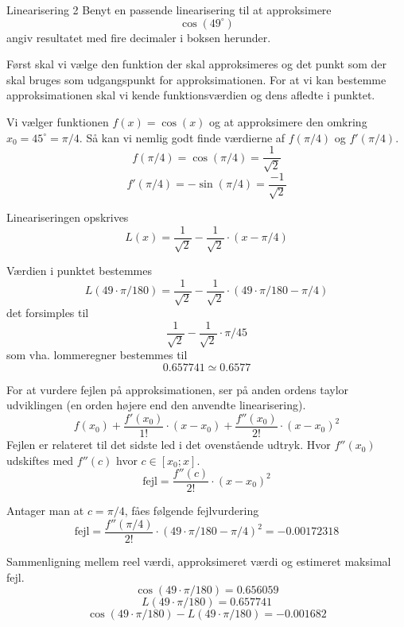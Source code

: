 \documentclass{article}
\begin{document}
\begin{exercise}{Linearisering 2}
Benyt en passende linearisering til at approksimere
\[
\cos(49^\circ)
\]
angiv resultatet med fire decimaler i boksen herunder.

\hint
Først skal vi vælge den funktion der skal approksimeres
og det punkt som der skal bruges som udgangspunkt for 
approksimationen.
For at vi kan bestemme approksimationen skal vi 
kende funktionsværdien og dens afledte i punktet.

\hint
Vi vælger funktionen $f(x) = \cos(x)$ og at approksimere den 
omkring $x_0 = 45^\circ = \pi / 4$.
Så kan vi nemlig godt finde værdierne af $f(\pi / 4)$ og $f'(\pi / 4)$.
\[
f(\pi / 4) = \cos(\pi / 4) = \frac{1}{\sqrt{2}}
\]
\[
f'(\pi / 4) = -\sin(\pi / 4) = \frac{-1}{\sqrt{2}}
\]

\hint
Lineariseringen opskrives
\[
L(x) = \frac{1}{\sqrt{2}} - \frac{1}{\sqrt{2}} \cdot (x - \pi / 4)
\]

\hint
Værdien i punktet bestemmes
\[
L(49 \cdot \pi / 180) = \frac{1}{\sqrt{2}} - \frac{1}{\sqrt{2}} \cdot (49 \cdot \pi / 180 - \pi / 4) 
\]
det forsimples til 
\[
\frac{1}{\sqrt{2}} - \frac{1}{\sqrt{2}} \cdot \pi / 45
\]
som vha. lommeregner bestemmes til 
\[
0.657741 \simeq 0.6577
\]

\hint
For at vurdere fejlen på approksimationen, ser på anden 
ordens taylor udviklingen (en orden højere end den 
anvendte linearisering).
\[
f(x_0) 
	+ \frac{f'(x_0)}{1!} \cdot (x - x_0) 
	+ \frac{f''(x_0)}{2!} \cdot (x - x_0)^2
\]
Fejlen er relateret til det sidste led i det ovenstående udtryk.
Hvor $f''(x_0)$ udskiftes med $f''(c)$ hvor $c \in [x_0; x]$.
\[
\textrm{fejl} = \frac{f''(c)}{2!} \cdot (x - x_0)^2
\]

\hint 
Antager man at $c = \pi/4$, fåes følgende fejlvurdering
\[
\textrm{fejl} = \frac{f''(\pi/4)}{2!} \cdot (49 \cdot \pi / 180 - \pi / 4)^2 = 
-0.00172318\]

\hint
Sammenligning mellem reel værdi, approksimeret værdi og estimeret maksimal fejl.
\[
\cos(49 \cdot \pi/180) = 0.656059
\]
\[
L(49 \cdot \pi/180) = 0.657741
\]
\[
\cos(49 \cdot \pi/180) - L(49 \cdot \pi/180) = -0.001682
\]

\end{exercise}
\end{document}
